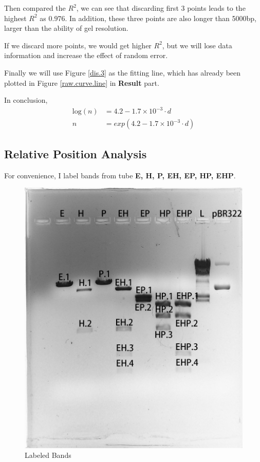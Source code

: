 \documentclass{article}
\begin{document}
            Then compared the $R^2$, we can see that discarding first 3 points leads to the highest $R^2$ as $0.976$. In addition, these three points are also longer than 5000bp, larger than the ability of gel resolution. 

            If we discard more points, we would get higher $R^2$, but we will lose data information and increase the effect of random error.

            Finally we will use Figure \ref{dis.3} as the fitting line, which has already been plotted in Figure \ref{raw.curve.line} in \textbf{Result} part.

            In conclusion,
            $$
            \begin{aligned}
                \text{log}(n) &= 4.2 - 1.7\times 10 ^ {-3} \cdot d\\
                n &= exp(4.2 - 1.7 \times 10 ^ {-3} \cdot d)
            \end{aligned}
            $$

        \subsection{Relative Position Analysis}
            For convenience, I label bands from tube \textbf{E, H, P, EH, EP, HP, EHP}.
            \begin{figure}[H]
                \centering
                \includegraphics[width = 0.4\linewidth]{../Data/xun_and_sam_label.png}
                \caption{Labeled Bands}
                \label{label.bands}
            \end{figure}
\end{document}
